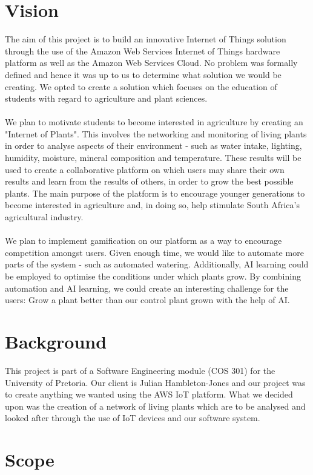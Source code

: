 \documentclass{article}
\let\cleardoublepage\clearpage
\begin{document}
\section{Vision}
The aim of this project is to build an innovative Internet of Things solution through the use of the Amazon Web Services Internet of Things hardware platform as well as the Amazon Web Services Cloud. No problem was formally defined and hence it was up to us to determine what solution we would be creating. We opted to create a solution which focuses on the education of students with regard to agriculture and plant sciences.\\\\
We plan to motivate students to become interested in agriculture by creating an "Internet of Plants". This involves the networking and monitoring of living plants in order to analyse aspects of their environment - such as water intake, lighting, humidity, moisture, mineral composition and temperature. These results will be used to create a collaborative platform on which users may share their own results and learn from the results of others, in order to grow the best possible plants. The main purpose of the platform is to encourage younger generations to become interested in agriculture and, in doing so, help stimulate South Africa's agricultural industry.\\\\
We plan to implement gamification on our platform as a way to encourage competition amongst users. Given enough time, we would like to automate more parts of the system - such as automated watering. Additionally, AI learning could be employed to optimise the conditions under which plants grow. By combining automation and AI learning, we could create an interesting challenge for the users: Grow a plant better than our control plant grown with the help of AI.

\section{Background}
This project is part of a Software Engineering module (COS 301) for the University of Pretoria. Our client is Julian Hambleton-Jones and our project was to create anything we wanted using the AWS IoT platform. What we decided upon was the creation of a network of living plants which are to be analysed and looked after through the use of IoT devices and our software system.
	
\cleardoublepage
\section{Scope}
\end{document}
